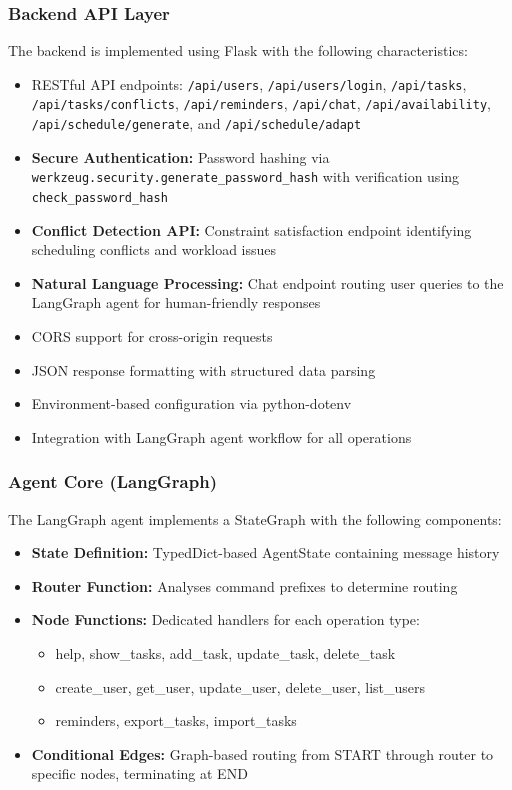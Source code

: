 \documentclass[12pt]{article}
\begin{document}
\subsubsection{Backend API Layer}
The backend is implemented using Flask with the following characteristics:
\begin{itemize}
    \item RESTful API endpoints: \texttt{/api/users}, \texttt{/api/users/login}, \texttt{/api/tasks}, \texttt{/api/tasks/conflicts}, \texttt{/api/reminders}, \texttt{/api/chat}, \texttt{/api/availability}, \texttt{/api/schedule/generate}, and \texttt{/api/schedule/adapt}
    \item \textbf{Secure Authentication:} Password hashing via \texttt{werkzeug.security.generate\_password\_hash} with verification using \texttt{check\_password\_hash}
    \item \textbf{Conflict Detection API:} Constraint satisfaction endpoint identifying scheduling conflicts and workload issues
    \item \textbf{Natural Language Processing:} Chat endpoint routing user queries to the LangGraph agent for human-friendly responses
    \item CORS support for cross-origin requests
    \item JSON response formatting with structured data parsing
    \item Environment-based configuration via python-dotenv
    \item Integration with LangGraph agent workflow for all operations
\end{itemize}

\subsubsection{Agent Core (LangGraph)}
The LangGraph agent implements a StateGraph with the following components:
\begin{itemize}
    \item \textbf{State Definition:} TypedDict-based AgentState containing message history
    \item \textbf{Router Function:} Analyses command prefixes to determine routing
    \item \textbf{Node Functions:} Dedicated handlers for each operation type:
    \begin{itemize}
        \item help, show\_tasks, add\_task, update\_task, delete\_task
        \item create\_user, get\_user, update\_user, delete\_user, list\_users
        \item reminders, export\_tasks, import\_tasks
    \end{itemize}
    \item \textbf{Conditional Edges:} Graph-based routing from START through router to specific nodes, terminating at END
\end{itemize}
\end{document}
